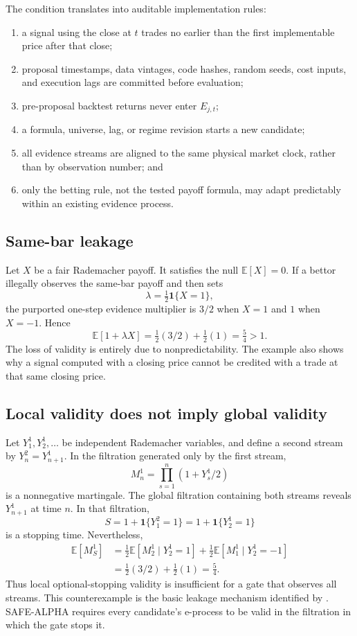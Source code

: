 The condition translates into auditable implementation rules:
\begin{enumerate}
 \item a signal using the close at \(t\) trades no earlier than the first
       implementable price after that close;
 \item proposal timestamps, data vintages, code hashes, random seeds, cost
       inputs, and execution lags are committed before evaluation;
 \item pre-proposal backtest returns never enter \(E_{j,t}\);
 \item a formula, universe, lag, or regime revision starts a new candidate;
 \item all evidence streams are aligned to the same physical market clock,
       rather than by observation number; and
 \item only the betting rule, not the tested payoff formula, may adapt
       predictably within an existing evidence process.
\end{enumerate}

\subsection{Same-bar leakage}
\label{app:same-bar}

Let \(X\) be a fair Rademacher payoff.  It satisfies the null
\(\mathbb E[X]=0\).  If a bettor illegally observes the same-bar payoff and
then sets
\[
  \lambda=\tfrac12\mathbf 1\{X=1\},
\]
the purported one-step evidence multiplier is \(3/2\) when \(X=1\) and \(1\)
when \(X=-1\).  Hence
\[
  \mathbb E[1+\lambda X]
  =\tfrac12(3/2)+\tfrac12(1)=\tfrac54>1.
\]
The loss of validity is entirely due to nonpredictability.  The example also
shows why a signal computed with a closing price cannot be credited with a
trade at that same closing price.

\subsection{Local validity does not imply global validity}
\label{app:local-global}

Let \(Y^1_1,Y^1_2,\ldots\) be independent Rademacher variables, and define a
second stream by \(Y^2_n=Y^1_{n+1}\).  In the filtration generated only by
the first stream,
\[
  M^1_n=\prod_{s=1}^n(1+Y^1_s/2)
\]
is a nonnegative martingale.  The global filtration containing both streams
reveals \(Y^1_{n+1}\) at time \(n\).  In that filtration,
\[
  S=1+\mathbf 1\{Y^2_1=1\}
    =1+\mathbf 1\{Y^1_2=1\}
\]
is a stopping time.  Nevertheless,
\begin{align*}
 \mathbb E[M^1_S]
 &=\tfrac12\mathbb E[M^1_2\mid Y^1_2=1]
   +\tfrac12\mathbb E[M^1_1\mid Y^1_2=-1]\\
 &=\tfrac12(3/2)+\tfrac12(1)=\tfrac54.
\end{align*}
Thus local optional-stopping validity is insufficient for a gate that
observes all streams.  This counterexample is the basic leakage mechanism
identified by \citet{wang2025stopped}.  SAFE-ALPHA requires every candidate's
e-process to be valid in the filtration in which the gate stops it.

